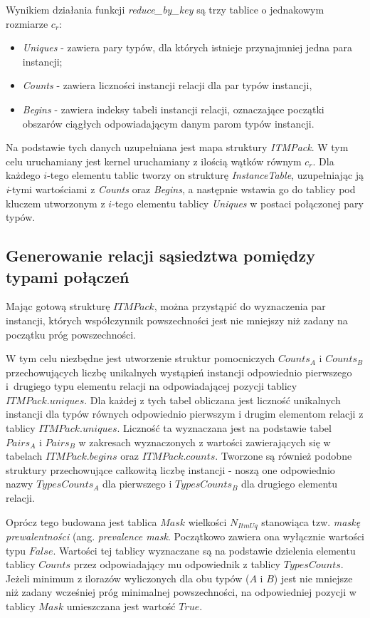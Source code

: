 \documentclass[12pt]{article}
\begin{document}
Wynikiem działania funkcji \textit{reduce\_by\_key} są trzy tablice o jednakowym rozmiarze $ c_{r} $:
\begin{itemize}
\item \textit{Uniques} - zawiera pary typów, dla których istnieje przynajmniej jedna para instancji;
\item \textit{Counts} - zawiera liczności instancji relacji dla par typów instancji,
\item \textit{Begins} - zawiera indeksy tabeli instancji relacji, oznaczające początki obszarów ciągłych odpowiadającym danym parom typów instancji.
\end{itemize}

Na podstawie tych danych uzupełniana jest mapa struktury \textit{ITMPack}. W tym celu uruchamiany jest kernel uruchamiany z ilością wątków równym $ c_{r} $. Dla każdego $ i $-tego elementu tablic tworzy on strukturę \textit{InstanceTable}, uzupełniając ją \textit{i}-tymi wartościami z \textit{Counts} oraz \textit{Begins}, a następnie wstawia go do tablicy pod kluczem utworzonym z $i$-tego elementu tablicy \textit{Uniques} w postaci połączonej pary typów. 

\subsection{Generowanie relacji sąsiedztwa pomiędzy typami połączeń}

Mając gotową strukturę $ ITMPack $, można przystąpić do wyznaczenia par instancji, których współczynnik powszechności jest nie mniejszy niż zadany na początku próg powszechności. 

W tym celu niezbędne jest utworzenie struktur pomocniczych $ Counts_{A} $ i $ Counts_{B} $ przechowujących liczbę unikalnych wystąpień instancji odpowiednio pierwszego i~drugiego typu elementu relacji na odpowiadającej pozycji tablicy $ ITMPack.uniques $. Dla każdej z tych tabel obliczana jest liczność unikalnych instancji dla typów równych odpowiednio pierwszym i drugim elementom relacji z tablicy \linebreak $ ITMPack.uniques $. Liczność ta wyznaczana jest na podstawie tabel $ Pairs_{A} $ i $ Pairs_{B} $ w zakresach wyznaczonych z wartości zawierających się w tabelach $ ITMPack.begins $ oraz $ ITMPack.counts $. Tworzone są również podobne struktury przechowujące całkowitą liczbę instancji - noszą one odpowiednio nazwy $ TypesCounts_{A} $ dla pierwszego i $ TypesCounts_{B} $ dla drugiego elementu relacji.

Oprócz tego budowana jest tablica $ Mask $ wielkości $ N_{ItmUq} $ stanowiąca tzw. \textit{maskę prewalentności} (ang. \textit{prevalence mask}. Początkowo zawiera ona wyłącznie wartości typu $ False $. Wartości tej tablicy wyznaczane są na podstawie dzielenia elementu tablicy $ Counts $ przez odpowiadający mu odpowiednik z tablicy $ TypesCounts $. Jeżeli minimum z ilorazów wyliczonych dla obu typów ($ A $ i $ B $) jest nie mniejsze niż zadany wcześniej próg minimalnej powszechności, na odpowiedniej pozycji w tablicy $ Mask $ umieszczana jest wartość $ True $.
\end{document}
